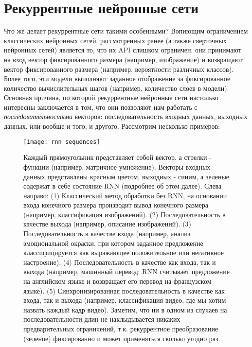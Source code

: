 


\section{Рекуррентные нейронные сети}

Что же делает рекуррентные сети такими особенными? Вопиющим 
ограничением классических нейронных сетей, рассмотренных ранее 
(а также сверточных нейронных сетей) 
является то, что их API слишком ограничен: 
они принимают на вход вектор фиксированного размера (например, изображение) 
и возвращают вектор фиксированного размера (например, вероятности 
различных классов). Более того, эти модели выполняют заданное отображение за 
фиксированное количество вычислительных шагов (например, количество слоев в модели). 
Основная причина, по которой рекуррентные нейронные сети настолько интересны 
заключается в том, что они позволяют нам работать с \textit{последовательностями} 
векторов: последовательность входных данных, выходных данных, или вообще и того, 
и другого. Рассмотрим несколько примеров:

\begin{figure}[h!]
    \centering
    \texttt{[image: rnn\_sequences]}
    \caption{Каждый прямоугольник представляет собой вектор, а стрелки - функции (например, 
    матричное умножение). Векторы входных данных представлены красным цветом, выходных - синим, 
    а зеленые содержат в себе состояние RNN (подробнее об этом далее). Слева направо: 
    (1) Классический метод обработки без RNN, на основании входа конечного размера производит 
    вывод конечного размера (например, классификация изображений). (2) Последовательность 
    в качестве выхода (например, описание изображений). (3) Последовательность в качестве входа 
    (например, анализ эмоциональной окраски, при котором заданное предложение 
    классифицируется как выражающее положительное или негативное настроение). (4) 
    Последовательность в качестве как входа, так и выхода (например, машинный перевод: 
    RNN считывает предложение на английском языке и возвращает его перевод на 
    французском языке). (5) Синхронизированная последовательность в качестве как входа, 
    так и выхода (например, классификация видео, где мы хотим назвать каждый кадр видео). 
    Заметим, что ни в одном из случаев на последовательности длин не наклыдывается 
    никаких предварительных ограничений, т.к. рекуррентное преобразование (зеленое) 
    фиксированно и может применяться сколько угодно раз.}
    \label{fig:rnn_sequences}
\end{figure}

